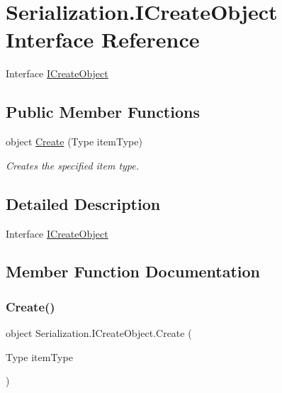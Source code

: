 \hypertarget{interface_serialization_1_1_i_create_object}{}\section{Serialization.\+I\+Create\+Object Interface Reference}
\label{interface_serialization_1_1_i_create_object}


Interface \hyperlink{interface_serialization_1_1_i_create_object}{I\+Create\+Object}  


\subsection*{Public Member Functions}
\begin{DoxyCompactItemize}
\item 
object \hyperlink{interface_serialization_1_1_i_create_object_a203d0586d4ab735f18519ff79d1ce4d6}{Create} (Type item\+Type)
\begin{DoxyCompactList}\small\item\em Creates the specified item type. \end{DoxyCompactList}\end{DoxyCompactItemize}


\subsection{Detailed Description}
Interface \hyperlink{interface_serialization_1_1_i_create_object}{I\+Create\+Object} 



\subsection{Member Function Documentation}
\mbox{\label{interface_serialization_1_1_i_create_object_a203d0586d4ab735f18519ff79d1ce4d6}} 
\subsubsection{\texorpdfstring{Create()}{Create()}}
{\footnotesize\ttfamily object Serialization.\+I\+Create\+Object.\+Create (\begin{DoxyParamCaption}\item[{Type}]{item\+Type }\end{DoxyParamCaption})}



